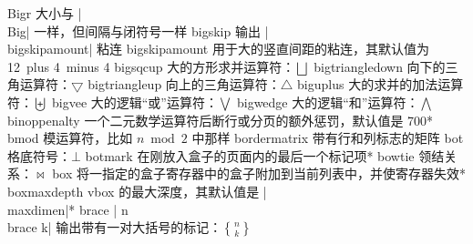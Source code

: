 \capcs Bigr {大小与 |\\Big| 一样，但间隔与闭符号一样}{}{}
\capcs bigskip {输出 |\\bigskipamount| 粘连}{}{}
\capcs bigskipamount {用于大的竖直间距的粘连，其默认值为 12\pt\ plus 4\pt\ minus 4\pt}{}{}
\capcs bigsqcup {大的方形求并运算符：$\bigsqcup$}{}{}
\capcs bigtriangledown {向下的三角运算符：$\bigtriangledown$}{}{}
\capcs bigtriangleup {向上的三角运算符：$\bigtriangleup$}{}{}
\capcs biguplus {大的求并的加法运算符：$\biguplus$}{}{}
\capcs bigvee {大的逻辑“或”运算符：$\bigvee$}{}{}
\capcs bigwedge {大的逻辑“和”运算符：$\bigwedge$}{}{}
\capcs binoppenalty {一个二元数学运算符后断行或分页的额外惩罚，默认值是 700}*{}
\capcs bmod {模运算符，比如 $n \bmod 2$ 中那样}{}{}
\capcs bordermatrix {带有行和列标志的矩阵}{}{}
\capcs bot {格底符号：$\bot$}{}{}
\capcs botmark {在刚放入盒子的页面内的最后一个标记项}*{}
\capcs bowtie {领结关系：$\bowtie$}{}{}
\capcs box {将一指定的盒子寄存器中的盒子附加到当前列表中，并使寄存器失效}*{}
\capcs boxmaxdepth {vbox 的最大深度，其默认值是 |\\maxdimen|}*{}
\capcs brace {| n\\brace k| 输出带有一对大括号的标记：$n \brace k$}{}{}
